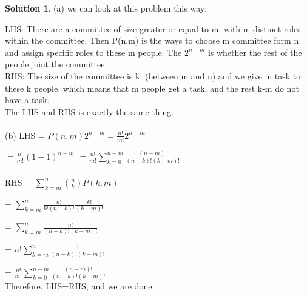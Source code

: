 \documentclass{article}
\theoremstyle{definition}
\newtheorem*{solution}{Solution}
\begin{document}
\begin{solution}
(a) we can look at this problem this way:

LHS: There are a committee of size greater or equal to m, with m distinct roles within the committee.
Then P(n,m) is the ways to choose m committee form n and assign specific roles to these m people.
The \(2^{n-m}\) is whether the rest of the people joint the committee.\\

RHS: The size of the committee is k, (between m and n) and we give m task to these k people, which means that m people get a task, and the rest k-m do not have a task.\\

The LHS and RHS is exactly the same thing.\\\\

(b) LHS = \(P(n,m)2^{n-m} = \frac{n!}{m!}2^{n-m}\)

\( = \frac{n!}{m!}(1+1)^{n-m}\)
\( =\frac{n!}{m!} \sum_{k=0}^{n-m}{\frac{(n-m)!}{(n-k)!(k-m)!}}\)\\\\


RHS = \(\sum_{k=m}^{n}{n\choose{k}}P(k,m)\)

= \(\sum_{k=m}^{n}{\frac{n!}{k!(n-k)!}}{\frac{k!}{(k-m)!}}\)

= \(\sum_{k=m}^{n}{\frac{n!}{(n-k)!(k-m)!}}\)

= \(n!\sum_{k=m}^{n}{\frac{1}{(n-k)!(k-m)!}}\)

= \(\frac{n!}{m!}\sum_{k=0}^{n-m}{\frac{(n-m)!}{(n-k)!(k-m)!}}\)\\

Therefore, LHS=RHS, and we are done.







\end{solution}
\end{document}
